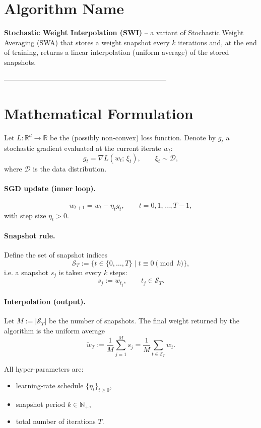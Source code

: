 \documentclass{article}
\newcommand{\R}{\mathbb{R}}
\begin{document}
\section*{Algorithm Name}
\textbf{Stochastic Weight Interpolation (SWI)} – a variant of Stochastic Weight Averaging (SWA) that stores a weight snapshot every $k$ iterations and, at the end of training, returns a linear interpolation (uniform average) of the stored snapshots.

---------------------------------------------------------------------

\section*{Mathematical Formulation}
Let $L:\R^{d}\rightarrow\R$ be the (possibly non‑convex) loss function.  
Denote by $g_t$ a stochastic gradient evaluated at the current iterate $w_t$:
\[
g_t = \nabla L(w_t;\,\xi_t),\qquad \xi_t\sim\mathcal{D},
\]
where $\mathcal{D}$ is the data distribution.  

\paragraph{SGD update (inner loop).}
\[
\boxed{w_{t+1}=w_t-\eta_t g_t},\qquad t=0,1,\dots ,T-1,
\]
with step size $\eta_t>0$.

\paragraph{Snapshot rule.}
Define the set of snapshot indices
\[
\mathcal{S}_T:=\{t\in\{0,\dots ,T\}\mid t\equiv 0\pmod{k}\},
\]
i.e. a snapshot $s_j$ is taken every $k$ steps:
\[
s_j := w_{t_j},\qquad t_j\in\mathcal{S}_T .
\]

\paragraph{Interpolation (output).}
Let $M:=|\mathcal{S}_T|$ be the number of snapshots.  
The final weight returned by the algorithm is the uniform average
\[
\boxed{\widetilde w_T:=\frac1M\sum_{j=1}^{M}s_j
      =\frac1M\sum_{t\in\mathcal{S}_T} w_t } .
\]

All hyper‑parameters are:
\begin{itemize}
  \item learning‑rate schedule $\{\eta_t\}_{t\ge0}$,
  \item snapshot period $k\in\mathbb{N}_{+}$,
  \item total number of iterations $T$.
\end{itemize}
\end{document}
